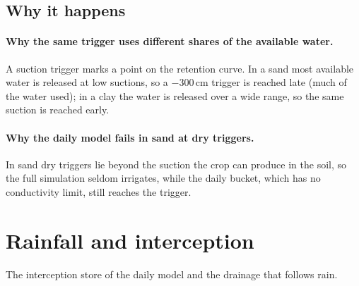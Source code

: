 \subsection{Why it happens}
\paragraph{Why the same trigger uses different shares of the available water.} A suction trigger marks a point on the retention curve. In a sand most available water is released at low suctions, so a $-300$\,cm trigger is reached late (much of the water used); in a clay the water is released over a wide range, so the same suction is reached early.

\paragraph{Why the daily model fails in sand at dry triggers.} In sand dry triggers lie beyond the suction the crop can produce in the soil, so the full simulation seldom irrigates, while the daily bucket, which has no conductivity limit, still reaches the trigger.


\section{Rainfall and interception}
The interception store of the daily model and the drainage that follows rain.

